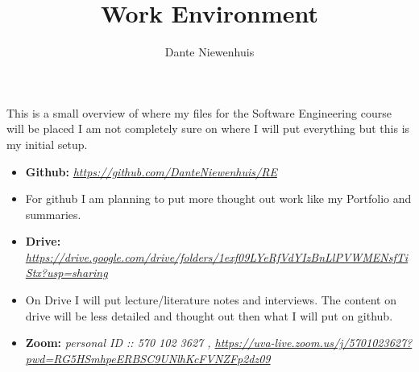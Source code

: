 \documentclass{article}
\title{Work Environment}
\author{Dante Niewenhuis}
\begin{document}
\maketitle

This is a small overview of where my files for the Software Engineering course will be placed 
I am not completely sure on where I will put everything but this is my initial setup.

\begin{itemize}
    \item[] \textbf{Github: } \textit{\url{https://github.com/DanteNiewenhuis/RE}} 
    \item[] For github I am planning to put more thought out work like my Portfolio and summaries.
    \item[] \textbf{Drive: } \textit{\url{https://drive.google.com/drive/folders/1exf09LYeRfVdYIzBnLlPVWMENsfTiStx?usp=sharing}}
    \item[] On Drive I will put lecture/literature notes and interviews. The content on drive will be less detailed and thought out then what I will put on github.  
    \item[] \textbf{Zoom: } \textit{personal ID :: 570 102 3627 , \url{https://uva-live.zoom.us/j/5701023627?pwd=RG5HSmhpeERBSC9UNlhKcFVNZFp2dz09}}
\end{itemize}
\end{document}
